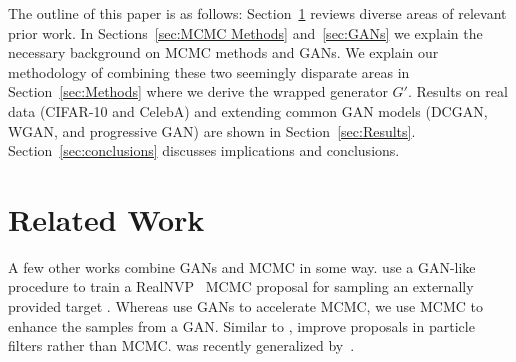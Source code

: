 \documentclass{article}
\newcommand{\target}{{p^\star}}
\begin{document}
The outline of this paper is as follows:
Section~\ref{sec:Related Work} reviews diverse areas of relevant prior work.
In Sections~\ref{sec:MCMC Methods} and~\ref{sec:GANs} we explain the necessary background on MCMC methods and GANs.
We explain our methodology of combining these two seemingly disparate areas in Section~\ref{sec:Methods} where we derive the wrapped generator $G'$.
Results on real data (CIFAR-10 and CelebA) and extending common GAN models (DCGAN, WGAN, and progressive GAN) are shown in Section~\ref{sec:Results}.
Section~\ref{sec:conclusions} discusses implications and conclusions.

\section{Related Work}
\label{sec:Related Work}

A few other works combine GANs and MCMC in some way.
\citet{Song2017} use a GAN-like procedure to train a RealNVP~\citep{Dinh2016} MCMC proposal for sampling an externally provided target \smash{$\target$}.
Whereas \citet{Song2017} use GANs to accelerate MCMC, we use MCMC to enhance the samples from a GAN\@.
Similar to \citet{Song2017}, \citet{Kempinska2017} improve proposals in particle filters rather than MCMC\@.
\citet{Song2017} was recently generalized by~\citet{Neklyudov2018}.

\end{document}
